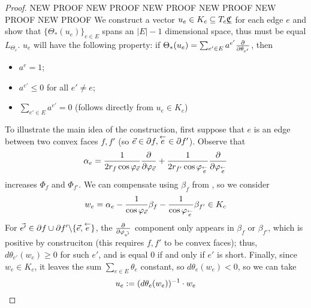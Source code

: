 \begin{proof}
NEW PROOF NEW PROOF NEW PROOF NEW PROOF NEW PROOF NEW PROOF 
We construct a vector $u_e \in K_c \subseteq T_c {\underline{\mathfrak{C}}}$ for each edge $e$
and show that $\{\Theta_*(u_e)\}_{e\in E}$ spans an
$|E|-1$ dimensional space,
thus must be equal $L_{\Theta_c}$.
$u_e$ will have the following property:
if $\Theta_*(u_e) = \sum_{e' \in E} a^{e'} {\frac{\partial}{\partial \theta_{e'}}}$, then
\begin{itemize}
	\item $a^e = 1$;
	\item $a^{e'} \leq 0$ for all $e' \neq e$;
	\item $\sum_{e' \in E} a^{e'} = 0$ (follows directly from $u_e \in K_c$)
\end{itemize}


To illustrate the main idea of the construction,
first suppose that $e$ is an edge between two convex faces $f, f'$
(so $\vec{e} \in \partial f, \overset{\leftarrow}{e} \in \partial f'$).
Observe that %
\begin{equation}
\label{e:alpha_e}
\alpha_e = \frac{1}{2 r_f \cos \varphi_{\vec{e}}} {\frac{\partial}{\partial \varphi_{\vec{e}}}}
+ \frac{1}{2 r_{f'}\cos \varphi_{\overset{\leftarrow}{e}}} {\frac{\partial}{\partial \varphi_{\overset{\leftarrow}{e}}}}
\end{equation}
increases $\Phi_f$ and $\Phi_{f'}$.
We can compensate using $\beta_f$ from ,
so we consider
\[
w_e = \alpha_e - \frac{1}{\cos \varphi_{\vec{e}}} \beta_f
	- \frac{1}{\cos \varphi_{\overset{\leftarrow}{e}}} \beta_{f'} \in K_c
\]
For $\vec{e'} \in \partial f \cup \partial f' \backslash \{\vec{e},\overset{\leftarrow}{e}\}$,
the ${\frac{\partial}{\partial \varphi_{\vec{e'}}}}$ component only appears in $\beta_f$
or $\beta_{f'}$, which is positive by construciton
(this requires $f,f'$ to be convex faces);
thus, $d\theta_{e'}(w_e) \geq 0$ for such $e'$, and
is equal 0 if and only if $e'$ is short.
Finally, since $w_e \in K_c$, it leaves the sum $\sum_{e\in E} \theta_e$
constant, so $d\theta_e(w_e) < 0$, so we can take
\begin{equation}
\label{e:u_e}
u_e := (d\theta_e(w_e))^{-1} \cdot w_e
\end{equation}


\end{proof}

